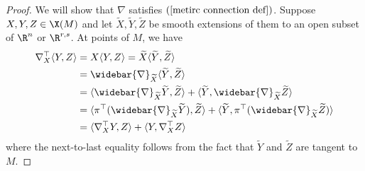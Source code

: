\begin{proof}
We will show that $\nabla$ satisfies $(\ref{metirc connection def})$. Suppose $X,Y,Z\in\X(M)$ and let $\widetilde{X},\widetilde{Y},\widetilde{Z}$ be smooth extensions 
of them to an open subset of $\R^n$ or $\R^{r,s}$. At points of $M$, we have
\begin{align*}
\nabla^{\top}_X\langle Y,Z\rangle&=X\langle Y,Z\rangle=\widetilde{X}\langle\widetilde{Y},\widetilde{Z}\rangle\\
&=\widebar{\nabla}_{\widetilde{X}}\langle\widetilde{Y},\widetilde{Z}\rangle\\
&=\langle\widebar{\nabla}_{\widetilde{X}}\widetilde{Y},\widetilde{Z}\rangle+\langle\widetilde{Y},\widebar{\nabla}_{\widetilde{X}}\widetilde{Z}\rangle\\
&=\langle\pi^{\top}(\widebar{\nabla}_{\widetilde{X}}\widetilde{Y}),\widetilde{Z}\rangle+\langle\widetilde{Y},\pi^{\top}(\widebar{\nabla}_{\widetilde{X}}\widetilde{Z})\rangle\\
&=\langle \nabla^{\top}_XY,Z\rangle+\langle Y,\nabla^{\top}_XZ\rangle
\end{align*}
where the next-to-last equality follows from the fact that $\widetilde{Y}$ and $\widetilde{Z}$ are tangent to $M$.
\end{proof}
